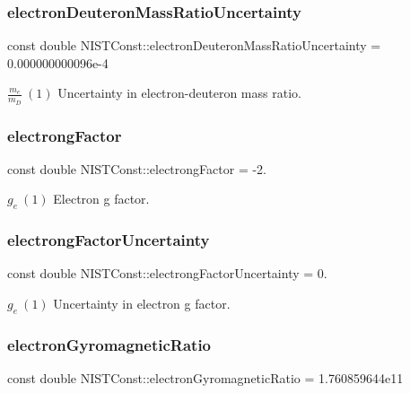 \subsubsection{\texorpdfstring{electron\+Deuteron\+Mass\+Ratio\+Uncertainty}{electronDeuteronMassRatioUncertainty}}
{\footnotesize\ttfamily const double N\+I\+S\+T\+Const\+::electron\+Deuteron\+Mass\+Ratio\+Uncertainty = 0.\+000000000096e-\/4}

$\frac{m_e}{m_D} \ (1)$ Uncertainty in electron-\/deuteron mass ratio. \mbox{\label{group___electron_ga65a20f263f8ef8f324ea6d1879050a66}} 
\subsubsection{\texorpdfstring{electrong\+Factor}{electrongFactor}}
{\footnotesize\ttfamily const double N\+I\+S\+T\+Const\+::electrong\+Factor = -\/2.}

$g_e \ (1)$ Electron g factor. \mbox{\label{group___electron_gadc2798c29deb855a95f7f0489c9af4cc}} 
\subsubsection{\texorpdfstring{electrong\+Factor\+Uncertainty}{electrongFactorUncertainty}}
{\footnotesize\ttfamily const double N\+I\+S\+T\+Const\+::electrong\+Factor\+Uncertainty = 0.}

$g_e \ (1)$ Uncertainty in electron g factor. \mbox{\label{group___electron_ga7c738b9078ca0308ee45d3b8bbafadb6}} 
\subsubsection{\texorpdfstring{electron\+Gyromagnetic\+Ratio}{electronGyromagneticRatio}}
{\footnotesize\ttfamily const double N\+I\+S\+T\+Const\+::electron\+Gyromagnetic\+Ratio = 1.\+760859644e11}


